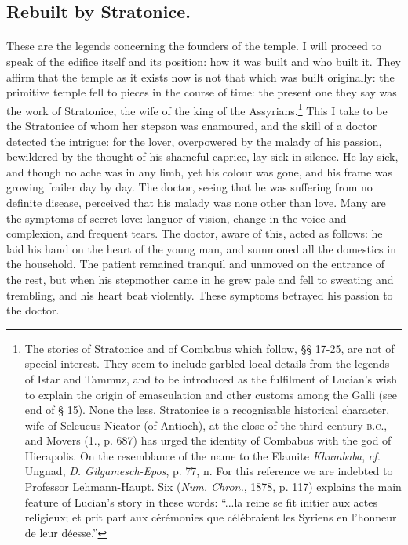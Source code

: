 \documentclass[a4paper, 11pt, oneside, polutonikogreek, english]{article}
\begin{document}
\subsection{Rebuilt by Stratonice.}
\paragraph{}
These are the legends concerning the founders of the temple. I will proceed to speak of the edifice itself and its position: how it was built and who built it. They affirm that the temple as it exists now is not that which was built originally: the primitive temple fell to pieces in the course of time: the present one they say was the work of Stratonice, the wife of the king of the Assyrians.\footnote{The stories of Stratonice and of Combabus which follow, §§ 17-25, are not of special interest. They seem to include garbled local details from the legends of Istar and Tammuz, and to be introduced as the fulfilment of Lucian's wish to explain the origin of emasculation and other customs among the Galli (see end of § 15). None the less, Stratonice is a recognisable historical character, wife of Seleucus Nicator (of Antioch), at the close of the third century \textsc{b.c.}, and Movers (1., p. 687) has urged the identity of Combabus with the god of Hierapolis. On the resemblance of the name to the Elamite \emph{Khumbaba}, \emph{cf.} Ungnad, \emph{D. Gilgamesch-Epos}, p. 77, n. For this reference we are indebted to Professor Lehmann-Haupt. Six (\emph{Num. Chron.}, 1878, p. 117) explains the main feature of Lucian's story in these words: ``...la reine se fit initier aux actes religieux; et prit part aux cérémonies que célébraient les Syriens en l'honneur de leur déesse.''} This I take to be the Stratonice of whom her stepson was enamoured, and the skill of a doctor detected the intrigue: for the lover, overpowered by the malady of his passion, bewildered by the thought of his shameful caprice, lay sick in silence. He lay sick, and though no ache was in any limb, yet his colour was gone, and his frame was growing frailer day by day. The doctor, seeing that he was suffering from no definite disease, perceived that his malady was none other than love. Many are the symptoms of secret love: languor of vision, change in the voice and complexion, and frequent tears. The doctor, aware of this, acted as follows: he laid his hand on the heart of the young man, and summoned all the domestics in the household. The patient remained tranquil and unmoved on the entrance of the rest, but when his stepmother came in he grew pale and fell to sweating and trembling, and his heart beat violently. These symptoms betrayed his passion to the doctor.
\end{document}
